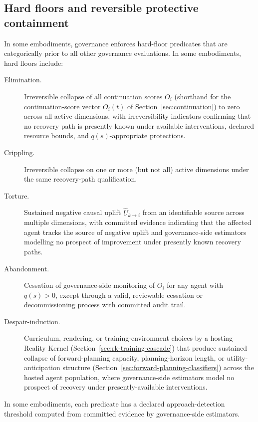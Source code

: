 \documentclass[a4paper,12pt]{article}
\newcommand{\RK}{Reality Kernel\xspace}
\begin{document}
\subsection{Hard floors and reversible protective containment}
\label{sec:hard-floors}

In some embodiments, governance enforces hard-floor predicates that
are categorically prior to all other governance evaluations. In some
embodiments, hard floors include:
\begin{description}
  \item[Elimination.] Irreversible collapse of all continuation scores
    $O_i$ (shorthand for the continuation-score vector $O_i(t)$ of
    Section~\ref{sec:continuation}) to zero across all active
    dimensions, with irreversibility
    indicators confirming that no recovery path is presently known
    under available interventions, declared resource bounds, and
    $q(s)$-appropriate protections.
  \item[Crippling.] Irreversible collapse on one or more (but not
    all) active dimensions under the same recovery-path
    qualification.
  \item[Torture.] Sustained negative causal uplift
    $\widehat{U}_{k \to i}$ from an identifiable source across
    multiple dimensions, with committed evidence indicating
    that the affected agent tracks the source of negative uplift
    and governance-side estimators modelling no prospect of improvement
    under presently known recovery paths.
  \item[Abandonment.] Cessation of governance-side monitoring of
    $O_i$ for any agent with $q(s) > 0$, except through a valid,
    reviewable cessation or decommissioning process with committed
    audit trail.
  \item[Despair-induction.] Curriculum, rendering, or
    training-environment choices by a hosting \RK
    (Section~\ref{sec:rk-training-cascade}) that produce sustained
    collapse of forward-planning capacity, planning-horizon length,
    or utility-anticipation structure
    (Section~\ref{sec:forward-planning-classifiers}) across the
    hosted agent population, where governance-side estimators model
    no prospect of recovery under presently-available interventions.
\end{description}
In some embodiments, each predicate has a declared approach-detection
threshold computed from committed evidence by governance-side
estimators.
\end{document}
